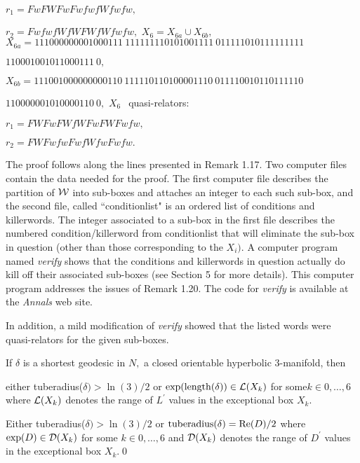 $r_1 = FwFWFwFwfwfWfwfw,$

$r_2 = FwfwfWfWFWfWfwfw,$
\vfil
\noindent $X_6 = X_{6a} \cup X_{6b},$
\vfil
\noindent $X_{6a} = 
111000000001000111\ 
111111110101001111\ 
011111010111111111$\hfill

\hfill  
$110001001011000111\ 0,$

\noindent $X_{6b} = 
111001000000000110\ 
111110110100001110\ 
011110010110111110$\hfill

\hfill  
$110000001010000110\ 0,$
\noindent $X_6\ \ $ quasi\/{\rm -}\/relators\/{\rm :}\/

$r_1 = FWFwFWfWFwFWFwfw,$

$r_2 = FWFwfwFwfWfwFwfw.$
\endproclaim

 
The proof follows along the lines presented in Remark 1.17.  
Two computer files contain the data needed for the proof.   
The first computer file describes the partition of ${\cal W}$ into
sub-boxes and attaches an integer to each such sub-box, 
and the second file, called ``conditionlist" is an ordered list of conditions and killerwords.
The integer associated to a sub-box in the first file describes the numbered condition/killerword from   conditionlist that will eliminate the sub-box
in question (other than those corresponding to the $X_i).$ A computer program named {\it verify} shows
that the conditions and killerwords in question actually do kill off their associated sub-boxes (see Section 5 for more details).  This computer
program addresses the issues of Remark 1.20.  The code for {\it
verify} is available at the {\it Annals} web site. 

In addition, a mild modification of {\it verify} showed that the listed words were quasi-relators for the given sub-boxes. 
\enddemo

 If $\delta$ is a shortest geodesic in $N,$ a closed orientable
hyperbolic $3$\/{\rm -}\/manifold{\rm ,} then 
\begin{itemize}
  either {\rm tuberadius(}$\delta) > \ln(3)/2$ or
$\exp({\rm length}(\delta))\in {\cal L}(X_k)$ for some\break $k\in {0,\ldots,6}$
 where ${\cal L}(X_k)$
denotes the range of $L^\prime$ values in the 
exceptional box $X_k.$ 

\ritem{ii)} Either {\rm tuberadius(}$\delta) > \ln(3)/2$ or
${\rm tuberadius}(\delta) = {\rm Re}(D)/2$ where\break $\exp(D)
\in {\cal D}(X_k)$ for some $k\in {0,\ldots,6}$
 and ${\cal D}(X_k)$
denotes the range of $D^\prime$ values in the 
exceptional box $X_k.$\hfill\qed
\end{itemize}

